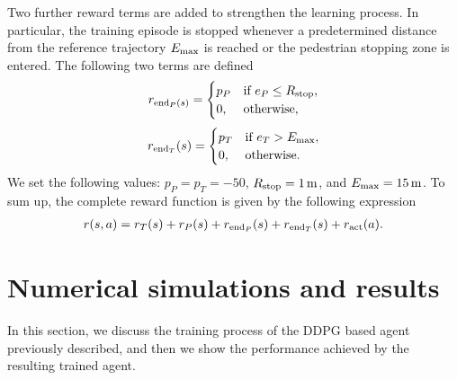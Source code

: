 Two further reward terms are added to strengthen the learning process. In particular, the training episode is stopped  whenever a predetermined distance from the reference trajectory $E_{\rm max}$ is reached or the pedestrian stopping zone is entered. The following two terms are defined 
\begin{equation}
	r_{{\rm end}_P(s)}=\begin{cases}p_{P} & \text{if } e_P \leq R_{ \rm stop}, \\ 0, & \text{otherwise},
	\end{cases} 
\end{equation}
\begin{equation}
	r_{{\rm end}_T}(s)=\begin{cases} p_T & \text{if } e_{T} > E_{\rm max},  \\ 0, & \text{otherwise}. 
	\end{cases} 
\end{equation}
We set the following values: $p_{P}=p_{T}=-50$, $R_{\rm stop}=\SI{1}{\metre}$, and $E_{\rm max}=\SI{15}{\metre}$. To sum up, the complete reward function is given by the following expression
\begin{equation}
	\begin{aligned}
		r(s,a)=r_{{T}}(s)+ r_{P}(s) + r_{{\rm end}_P}(s) + r_{{\rm end}_T}(s) +  r_{\rm act}(a).
	\end{aligned}
\end{equation}
\label{sub_sec:3-e}






\section{Numerical simulations and results}
\label{sec:Results and conclusions}
In this section, we discuss the training process of the DDPG based agent previously described, and then we show the performance achieved by the resulting trained agent.

